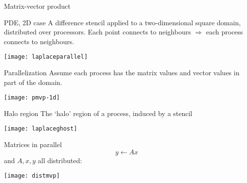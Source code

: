 \begin{comment}
  \begin{frame}{Block methods}
    \begin{itemize}
    \item GMRES does a block orthogonalization in every iteration
    \item in Conjugate Gradients:
      \begin{itemize}
      \item single orthogonalization
      \item matrix-vector product
      \end{itemize}
      (this is actually kinda modified Gram-Schmidt)
    \item $\Rightarrow$ communication minimization through block methods:\\
      compute $x,Ax,A^2x,\ldots,A^kx$, then block orthogonalize
    \item latency hiding vs numerical stability
    \end{itemize}
  \end{frame}
\end{comment}

 {Matrix-vector product}

\begin{frame}{PDE, 2D case}
    A difference stencil applied to a two-dimensional square
    domain, distributed over processors. Each point connects to
    neighbours $\Rightarrow$ each process connects to neighbours.

    \texttt{[image: laplaceparallel]}
\end{frame}

\begin{frame}{Parallelization}
  Assume each process has the matrix values and vector values in part
  of the domain.

  \texttt{[image: pmvp-1d]}

  
\end{frame}

\begin{frame}{Halo region}
  The `halo' region of a process, induced by a stencil

  \texttt{[image: laplaceghost]}
\end{frame}

\begin{frame}{Matrices in parallel}
  \[ y\leftarrow Ax\]
  and $A,x,y$ all distributed:

  \texttt{[image: distmvp]}
\end{frame}

